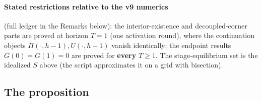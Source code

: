 \paragraph{Stated restrictions relative to the v9 numerics}
(full ledger in the Remarks below): the interior-existence and decoupled-corner parts are
proved at horizon $T=1$ (one activation round), where the continuation objects
$\Pi(\cdot,h-1),U(\cdot,h-1)$ vanish identically; the endpoint results $G(0)=G(1)=0$ are proved
for \textbf{every} $T\ge 1$. The stage-equilibrium set is the idealized $S$ above (the script
approximates it on a grid with bisection).

\subsection*{The proposition}

